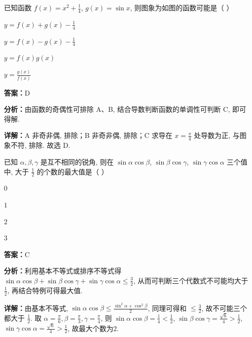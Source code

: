 \begin{question}[points=4]
已知函数 $f(x) = x^2 + \frac{1}{4}$, $g(x) = \sin x$, 则图象为如图的函数可能是（   ）
\begin{choices}
  \item $y = f(x) + g(x) - \frac{1}{4}$
  \item $y = f(x) - g(x) - \frac{1}{4}$
  \item $y = f(x)g(x)$
  \item $y = \frac{g(x)}{f(x)}$
\end{choices}
\begin{solution}
\textbf{答案：}D

\textbf{分析：}由函数的奇偶性可排除 A、B, 结合导数判断函数的单调性可判断 C, 即可得解.

\textbf{详解：}A 非奇非偶, 排除；B 非奇非偶, 排除；C 求导在 $x=\frac{\pi}{4}$ 处导数为正, 与图象不符, 排除. 故选 D.
\end{solution}
\end{question}

\begin{question}[points=4]
已知 $\alpha,\beta,\gamma$ 是互不相同的锐角, 则在 $\sin\alpha\cos\beta$, $\sin\beta\cos\gamma$, $\sin\gamma\cos\alpha$ 三个值中, 大于 $\frac{1}{2}$ 的个数的最大值是（   ）
\begin{choices}
  \item $0$
  \item $1$
  \item $2$
  \item $3$
\end{choices}
\begin{solution}
\textbf{答案：}C

\textbf{分析：}利用基本不等式或排序不等式得 $\sin\alpha\cos\beta+\sin\beta\cos\gamma+\sin\gamma\cos\alpha \leq \frac{3}{2}$, 从而可判断三个代数式不可能均大于 $\frac{1}{2}$, 再结合特例可得最大值.

\textbf{详解：}由基本不等式, $\sin\alpha\cos\beta \leq \frac{\sin^2\alpha+\cos^2\beta}{2}$, 同理可得和 $\leq \frac{3}{2}$, 故不可能三个都大于 $\frac{1}{2}$. 取 $\alpha=\frac{\pi}{6},\beta=\frac{\pi}{3},\gamma=\frac{\pi}{4}$, 则 $\sin\alpha\cos\beta = \frac{1}{4}<\frac{1}{2}$, $\sin\beta\cos\gamma = \frac{\sqrt{6}}{4}>\frac{1}{2}$, $\sin\gamma\cos\alpha = \frac{\sqrt{6}}{4}>\frac{1}{2}$, 故最大个数为2.
\end{solution}
\end{question}

